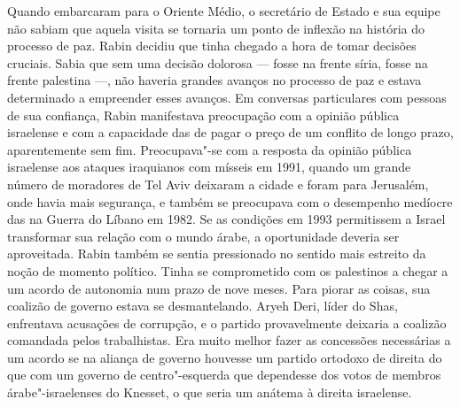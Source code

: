 Quando embarcaram para o Oriente Médio, o secretário de Estado e sua
equipe não sabiam que aquela visita se tornaria um ponto de inflexão na
história do processo de paz. Rabin decidiu que tinha chegado a hora de
tomar decisões cruciais. Sabia que sem uma decisão dolorosa --- fosse na
frente síria, fosse na frente palestina ---, não haveria grandes avanços
no processo de paz e estava determinado a empreender esses avanços. Em
conversas particulares com pessoas de sua confiança, Rabin manifestava
preocupação com a opinião pública israelense e com a capacidade das 
de pagar o preço de um conflito de longo prazo, aparentemente sem fim.
Preocupava"-se com a resposta da opinião pública israelense aos ataques
iraquianos com mísseis em 1991, quando um grande número de moradores de
Tel Aviv deixaram a cidade e foram para Jerusalém, onde havia mais
segurança, e também se preocupava com o desempenho medíocre das  na
Guerra do Líbano em 1982. Se as condições em 1993 permitissem a Israel
transformar sua relação com o mundo árabe, a oportunidade deveria ser
aproveitada. Rabin também se sentia pressionado no sentido mais estreito
da noção de momento político. Tinha se comprometido com os palestinos a
chegar a um acordo de autonomia num prazo de nove meses. Para piorar as
coisas, sua coalizão de governo estava se desmantelando. Aryeh Deri,
líder do Shas, enfrentava acusações de corrupção, e o partido
provavelmente deixaria a coalizão comandada pelos trabalhistas. Era
muito melhor fazer as concessões necessárias a um acordo se na aliança
de governo houvesse um partido ortodoxo de direita do que com um governo
de centro"-esquerda que dependesse dos votos de membros árabe"-israelenses
do Knesset, o que seria um anátema à direita israelense.

